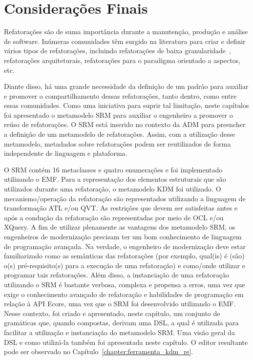 \section{Considerações Finais}
\label{sec:consideracoes_finais_SRM}

Refatorações são de suma importância durante a manutenção, produção e análise de software. Inúmeras comunidades têm surgido na literatura para criar e definir vários tipos de refatorações, incluindo refatorações de baixa granularidade~\cite{Fowler1999, Demeyer1, Demeyer2}, refatorações arquiteturais, refatorações para o paradigma orientado a aspectos, etc. 

Diante disso, há uma grande necessidade da definição de um padrão para auxiliar e promover o compartilhamento dessas refatorações, tanto dentro, como entre essas comunidades. Como uma iniciativa para suprir tal limitação, neste capítulos foi apresentado o metamodelo SRM para auxiliar o engenheiro a promover o reúso de refatorações. O SRM está inserido no contexto da ADM para preencher a definição de um metamodelo de refatorações. Assim, com a utilização desse metamodelo, metadados sobre refatorações podem ser reutilizados de forma independente de linguagem e plataforma.

O SRM contém 16 metaclasses e quatro enumerações e foi implementado utilizando o EMF. Para a representação dos elementos estruturais que são utilizados durante uma refatoração, o metamodelo KDM foi utilizado. O mecanismo/operação da refatoração são representados utilizando a linguagem de transformação ATL e/ou QVT. As restrições que devem ser satisfeitas antes e após a condução da refatoração são representadas por meio de OCL e/ou XQuery. A fim de utilizar plenamente as vantagens dos metamodelo SRM, os engenheiros de modernização precisam ter um bom conhecimento de linguagem de programação avançada. Na verdade, o engenheiro de modernização deve estar familiarizado como as semânticas das refatorações (por exemplo, qual(is) é (são) o(s) pré-requisito(s) para a execução de uma refatoração) e como/onde utilizar e programar tais refatorações. Além disso, a instanciação de uma refatoração utilizando o SRM é bastante verbosa, complexa e propensa a erros, uma vez que exige o conhecimento avançado de refatoração e habilidades de programação em relação à API Ecore, uma vez que o SRM foi desenvolvido utilizando o EMF. Nesse contexto, foi criado e apresentado, neste capítulo, um conjunto de gramáticas que, quando compostas, derivam uma DSL, a qual é utilizada para facilitar a utilização e instanciação do metamodelo SRM. Uma visão geral da DSL e como utilizá-la também foi apresentada neste capítulo. O editor resultante pode ser observado no Capítulo~\ref{chapter:ferramenta_kdm_re}. %

